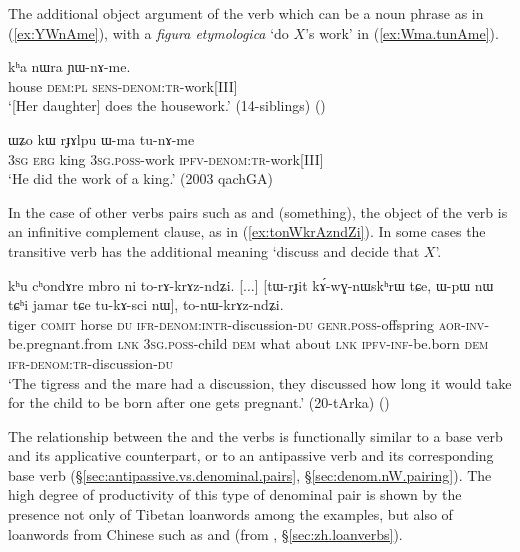 The additional object argument of the  verb which can be a noun phrase as in (\ref{ex:YWnAme}), with a \textit{figura etymologica}  `do $X$'s work' in (\ref{ex:Wma.tunAme}). 
  
\begin{exe}
\ex \label{ex:YWnAme}
 \gll kʰa nɯra ɲɯ-nɤ-me. \\
 house \textsc{dem}:\textsc{pl} \textsc{sens}-\textsc{denom}:\textsc{tr}-work[III] \\
 \glt `[Her daughter] does the housework.' (14-siblings) ()
  \end{exe} 
  
\begin{exe}
\ex \label{ex:Wma.tunAme}
 \gll  ɯʑo kɯ rɟɤlpu ɯ-ma tu-nɤ-me \\
 \textsc{3sg} \textsc{erg} king \textsc{3sg}.\textsc{poss}-work \textsc{ipfv}-\textsc{denom}:\textsc{tr}-work[III] \\
 \glt `He did the work of a king.' (2003 qachGA)
    \end{exe}

  In the case of other verbs pairs such as  and  (something), the object of the  verb is an infinitive complement clause, as in (\ref{ex:tonWkrAzndZi}). In some cases the transitive verb  has the additional meaning `discuss and decide that $X$'.

\begin{exe}
\ex \label{ex:tonWkrAzndZi}
 \gll  kʰu cʰondɤre mbro ni to-rɤ-krɤz-ndʑi. [...] [tɯ-rɟit kɤ́-wɣ-nɯskʰrɯ tɕe,
ɯ-pɯ nɯ tɕʰi jamar tɕe tu-kɤ-sci nɯ], to-nɯ-krɤz-ndʑi. \\
tiger \textsc{comit} horse \textsc{du} \textsc{ifr}-\textsc{denom}:\textsc{intr}-discussion-\textsc{du} { }
\textsc{genr}.\textsc{poss}-offspring \textsc{aor}-\textsc{inv}-be.pregnant.from \textsc{lnk} \textsc{3sg}.\textsc{poss}-child \textsc{dem} what about \textsc{lnk} \textsc{ipfv}-\textsc{inf}-be.born \textsc{dem} \textsc{ifr}-\textsc{denom}:\textsc{tr}-discussion-\textsc{du} \\
\glt `The tigress and the mare had a discussion, they discussed how long it would take for the child to be born after one gets pregnant.' (20-tArka) 	()
 \end{exe}
 
 The relationship between the  and the  verbs is functionally similar to a base verb and its applicative counterpart, or to an antipassive verb and its corresponding base verb (§\ref{sec:antipassive.vs.denominal.pairs}, §\ref{sec:denom.nW.pairing}). The high degree of productivity of this type of denominal pair is shown by the presence not only of Tibetan loanwords among the examples, but also of loanwords from Chinese such as  and   (from , §\ref{sec:zh.loanverbs}).

